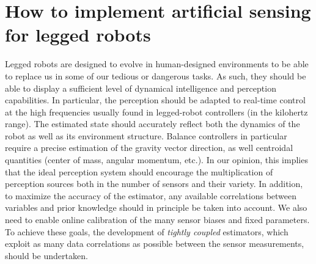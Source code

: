 





\section{How to implement artificial sensing for legged robots}

Legged robots are designed to evolve in human-designed environments to be able to replace us in some of our tedious or dangerous tasks. As such, they should be able to
display a sufficient level of dynamical intelligence and perception capabilities. 
In particular, the perception should be adapted to real-time control at the high frequencies usually found in legged-robot controllers (in the kilohertz range).
The estimated state should accurately reflect both the dynamics of the robot as well as its environment structure. Balance controllers in particular require a precise 
estimation of the gravity vector direction, as well centroidal quantities (center of mass, angular momentum, etc.).
In our opinion, this implies that the ideal perception system should encourage the multiplication of perception sources both in the number of sensors and their variety.
In addition, to maximize the accuracy of the estimator, any available correlations between variables and prior knowledge should in principle be taken into account. 
We also need to enable online calibration of the many sensor biases and fixed parameters. To achieve these goals, the development of \textit{tightly coupled} estimators, 
which exploit as many data correlations as possible between the sensor measurements, should be undertaken.

